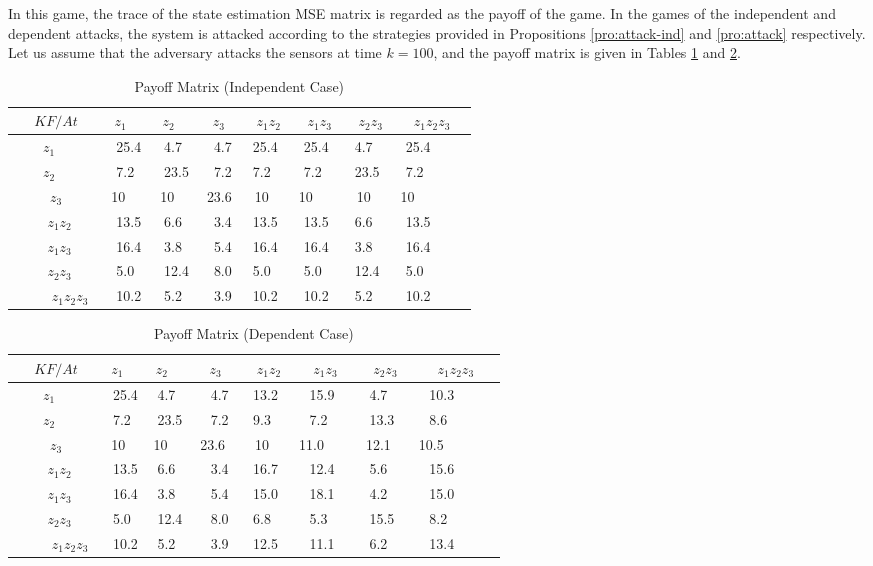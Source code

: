 \documentclass{article}
\begin{document}
 In this game, the trace of the  state estimation MSE matrix is regarded as the payoff of the game. In the games of the independent  and dependent attacks, the system is attacked according to the strategies provided  in Propositions \ref{pro:attack-ind} and \ref{pro:attack} respectively. Let us assume that the  adversary attacks the sensors at time $k=100$, and  the payoff matrix is given in Tables \ref{table:independent} and \ref{table:dependent}. 
\begin{table}
\caption{Payoff  Matrix (Independent Case)}
\vspace{0.1in}
{\footnotesize
	\begin{tabular}{|c|c|c|c|c|c|c|c|}
	\hline
	   $KF/At$       & $z_1$   &$ z_2$   & $z_3$  & $z_1z_2$ & $z_1z_3$ & $z_2z_3$ & $z_1z_2z_3$ \\ \hline
	    $z_1$       & 25.4 & 4.7  & 4.7 & 25.4  & 25.4  & 4.7   & 25.4     \\ 
	    $z_2$       & 7.2  & 23.5 & 7.2 & 7.2   & 7.2   & 23.5  & 7.2      \\ 
	    $z_3  $     & 10    & 10    & 23.6  & 10   & 10     & 10   & 10        \\ 
	    $z_1z_2$    & 13.5 & 6.6  & 3.4 & 13.5  & 13.5  & 6.6   & 13.5     \\ 
	    $z_1z_3$    & 16.4 & 3.8  & 5.4 & 16.4  & 16.4  & 3.8   & 16.4     \\ 
	    $z_2z_3$    & 5.0  & 12.4 & 8.0 & 5.0   & 5.0   & 12.4  & 5.0      \\ 
	    $z_1z_2z_3$ & 10.2 & 5.2  & 3.9 & 10.2  & 10.2  & 5.2   & 10.2     \\ \hline
	\end{tabular}
	}

\label{table:independent}
\end{table}
 \begin{table}
\caption{Payoff Matrix (Dependent Case)}
\vspace{0.1in}
{\footnotesize
 	\begin{tabular}{|c|c|c|c|c|c|c|c|}
 	\hline
 	   $KF/At$       & $z_1$   &$ z_2$   & $z_3$  & $z_1z_2$ & $z_1z_3$ & $z_2z_3$ & $z_1z_2z_3$ \\ \hline
 	    $z_1$       & 25.4 & 4.7  & 4.7 & 13.2  & 15.9  & 4.7   & 10.3     \\ 
 	    $z_2$       & 7.2  & 23.5 & 7.2 & 9.3   & 7.2   & 13.3  & 8.6      \\ 
 	    $z_3  $     & 10   & 10   & 23.6   & 10   & 11.0     & 12.1  & 10.5        \\ 
 	    $z_1z_2$    & 13.5 & 6.6  & 3.4 & 16.7  & 12.4  & 5.6   & 15.6     \\ 
 	    $z_1z_3$    & 16.4 & 3.8  & 5.4 & 15.0  & 18.1  & 4.2   & 15.0     \\ 
 	    $z_2z_3$    & 5.0  & 12.4 & 8.0 & 6.8   & 5.3   & 15.5  & 8.2      \\ 
 	    $z_1z_2z_3$ & 10.2 & 5.2  & 3.9 & 12.5  & 11.1  & 6.2   & 13.4     \\ \hline
 	\end{tabular}
 	}
 
 \label{table:dependent}
 \end{table}
\end{document}
